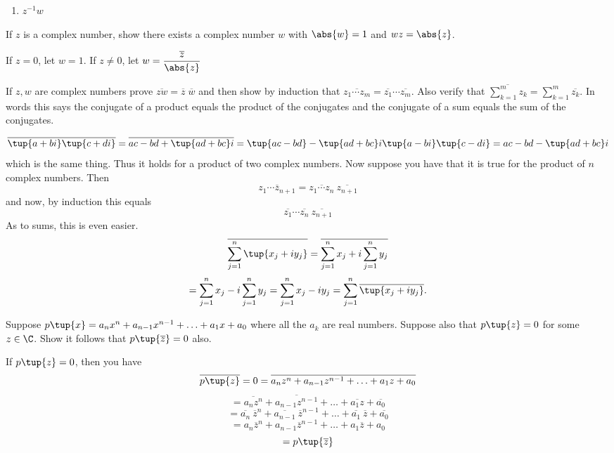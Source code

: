 \begin{enumialphparenastyle}
\begin{ex}
\begin{enumerate}
\item $z^{-1}w$

\end{enumerate}
\end{ex}

\begin{ex} If $z$ is a complex number, show there exists a complex
number $w$ with $\abs{w }=1$ and $wz=\abs{z}$. 
\begin{sol}
If $z=0$, let $w =1$. If $z\neq 0$, let $w =\displaystyle\frac{\overline{z}}{\abs{z}}$
\end{sol}
\end{ex}

\begin{ex} \label{exer-complex2}If $z,w$ are complex
 numbers prove $
\overline{zw}=\overline{z} \; \overline{w}$ and then show by induction that 
$\overline{z_{1}\cdots z_{m}}=\overline{z_{1}}\cdots \overline{z_{m}}$. Also
verify that $\overline{\sum_{k=1}^{m}z_{k}}=\sum_{k=1}^{m}\overline{z_{k}}$.
In words this says the conjugate of a product equals the product of the
conjugates and the conjugate of a sum equals the sum of the conjugates. 
\begin{sol}
\[
\overline{\tup{a+bi} \tup{c+di} }=\overline{ac-bd+\tup{
ad+bc}i }=\tup{ac-bd} -\tup{ad+bc}i \tup{
a-bi} \tup{c-di} =ac-bd-\tup{ad+bc}i 
\]
 which is the
same thing. Thus it holds for a product of two complex numbers. Now suppose
 you have that it is true for the product of $n$ complex numbers. Then
\[
\overline{z_{1}\cdots z_{n+1}}=\overline{z_{1}\cdots z_{n}}\ \overline{
z_{n+1}}
\]
and now, by induction this equals
\[
\overline{z_{1}}\cdots \overline{z_{n}}\ \overline{z_{n+1}}
\]
As to sums, this is even easier.
\[
\overline{\sum_{j=1}^{n}\tup{x_{j}+iy_{j}} }=\overline{%
\sum_{j=1}^{n}x_{j}+i\sum_{j=1}^{n}y_{j}}
\]
\[
=\sum_{j=1}^{n}x_{j}-i\sum_{j=1}^{n}y_{j}=\sum_{j=1}^{n}x_{j}-iy_{j}=
\sum_{j=1}^{n}\overline{\tup{x_{j}+iy_{j}} }.
\]
\end{sol}
\end{ex}

\begin{ex} \label{15-july-prob2}Suppose $p\tup{x}
=a_{n}x^{n}+a_{n-1}x^{n-1}+\ldots +a_{1}x+a_{0}$ where all the $a_{k}$ are
real numbers. Suppose also that $p\tup{z} =0$ for some $z\in \C$. Show it follows that $p\tup{\overline{z}} =0$ also. 
\begin{sol}
If $p\tup{z} =0$, then you have
\[
\overline{p\tup{z} }=0=\overline{a_{n}z^{n}+a_{n-1}z^{n-1}+\ldots+a_{1}z+a_{0}}
\]
\[
=\overline{a_{n}z^{n}}+\overline{a_{n-1}z^{n-1}}+\ldots +\overline{a_{1}z}+
\overline{a_{0}}
\]
\[
=\overline{a_{n}}\ \overline{z}^{n}+\overline{a_{n-1}}\ \overline{z}
^{n-1}+\ldots +\overline{a_{1}}\ \overline{z}+\overline{a_{0}}
\]
\[
=a_{n}\overline{z}^{n}+a_{n-1}\overline{z}^{n-1}+\ldots +a_{1}\overline{z}
+a_{0}
\]
\[
=p\tup{\overline{z}}
\]
\end{sol}
\end{ex}


\end{enumialphparenastyle}
